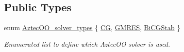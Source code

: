 \subsection*{Public Types}
\begin{DoxyCompactItemize}
\item 
enum \hyperlink{classoomph_1_1TrilinosAztecOOSolver_a8a9d76e6cfa1594b150de04413c0f958}{Aztec\+O\+O\+\_\+solver\+\_\+types} \{ \hyperlink{classoomph_1_1TrilinosAztecOOSolver_a8a9d76e6cfa1594b150de04413c0f958a444cf8d677f36a05433c69812a4d1e20}{CG}, 
\hyperlink{classoomph_1_1TrilinosAztecOOSolver_a8a9d76e6cfa1594b150de04413c0f958a1729a0500bca95c117f5795d06b83bb4}{G\+M\+R\+ES}, 
\hyperlink{classoomph_1_1TrilinosAztecOOSolver_a8a9d76e6cfa1594b150de04413c0f958ac6422728788cf5c341d1e3e988b4fc7d}{Bi\+C\+G\+Stab}
 \}\begin{DoxyCompactList}\small\item\em Enumerated list to define which Aztec\+OO solver is used. \end{DoxyCompactList}
\end{DoxyCompactItemize}
